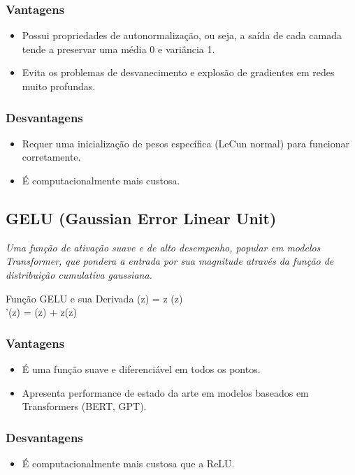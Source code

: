 \subsubsection*{Vantagens}
\begin{itemize}
    \item Possui propriedades de autonormalização, ou seja, a saída de cada camada tende a preservar uma média 0 e variância 1.
    \item Evita os problemas de desvanecimento e explosão de gradientes em redes muito profundas.
\end{itemize}
\subsubsection*{Desvantagens}
\begin{itemize}
    \item Requer uma inicialização de pesos específica (LeCun normal) para funcionar corretamente.
    \item É computacionalmente mais custosa.
\end{itemize}

\subsection{GELU (Gaussian Error Linear Unit)}
\textit{Uma função de ativação suave e de alto desempenho, popular em modelos Transformer, que pondera a entrada por sua magnitude através da função de distribuição cumulativa gaussiana.}
\begin{equacaodestaque}{Função GELU e sua Derivada}
    (z) = z \cdot \Phi(z) \\
    '(z) = \Phi(z) + z\phi(z)
\end{equacaodestaque}
\subsubsection*{Vantagens}
\begin{itemize}
    \item É uma função suave e diferenciável em todos os pontos.
    \item Apresenta performance de estado da arte em modelos baseados em Transformers (BERT, GPT).
\end{itemize}
\subsubsection*{Desvantagens}
\begin{itemize}
    \item É computacionalmente mais custosa que a ReLU.
\end{itemize}